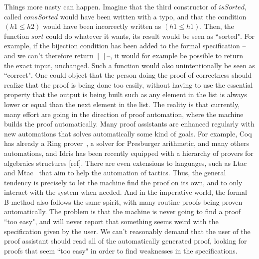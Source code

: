 Things more nasty can happen. Imagine that the third constructor of $isSorted$, called $consSorted$ would have been written with a typo, and that the condition $(h1 \leq h2) $ would have been incorrectly written as $(h1 \leq h1)$. Then, the function $sort$ could do whatever it wants, its result would be seen as ``sorted". For example, if the bijection condition has been added to the formal specification --and we can't therefore return $[\ ]$--, it would for example be possible to return the exact input, unchanged. Such a function would also unintentionally be seen as ``correct". One could object that the person doing the proof of correctness should realize that the proof is being done too easily, without having to use the essential property that the output is being built such as any element in the list is always lower or equal than the next element in the list. The reality is that currently, many effort are going in the direction of proof automation, where the machine builds the proof automatically. Many proof assistants are enhanced regularly with new automations that solves automatically some kind of goals. For example, Coq has already a Ring prover~\cite{coq2005}, a solver for Presburger arithmetic, and many others automations, and Idris has been recently equipped with a hierarchy of provers for algebraics structures [ref]. There are even extensions to languages, such as Ltac~\cite{DelahayeLTac} and Mtac~\cite{Ziliani13} that aim to help the automation of tactics.  Thus, the general tendency is precisely to let the machine find the proof on its own, and to only interact with the system when needed. And in the imperative world, the formal B-method also follows the same spirit, with many routine proofs being proven automatically. The problem is that the machine is never going to find a proof ``too easy", and will never report that something seems weird with the specification given by the user. We can't reasonably demand that the user of the proof assistant should read all of the automatically generated proof, looking for proofs that seem ``too easy" in order to find weaknesses in the specifications.

